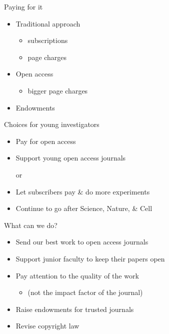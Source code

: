 \documentclass[12pt,t]{beamer}
\newcommand{\bi}{\begin{itemize}}
\newcommand{\ei}{\end{itemize}}
\begin{document}
\begin{frame}{Paying for it}

\vspace{36pt}

\bi
\itemsep12pt
\item Traditional approach
\bi
\item subscriptions
\item page charges
\ei
\item Open access
\bi
\item bigger page charges
\ei
\item Endowments
\ei
\end{frame}

\begin{frame}{Choices for young investigators}

\vspace{36pt}

\bi
\item Pay for open access
\item Support young open access journals

\vspace*{12pt}

\hspace{2cm} {\color{vhilight} \sc or}

\vspace*{12pt}

\item Let subscribers pay \& do more experiments
\item Continue to go after Science, Nature, \& Cell
\ei
\end{frame}


\begin{frame}{What can we do?}

\vspace{36pt}

\bi
\itemsep12pt
\item Send our best work to open access journals
\item Support junior faculty to keep their papers open
\item Pay attention to the quality of the work
\bi
\item[] (not the impact factor of the journal)
\ei
\item Raise endowments for trusted journals
\item {\color<2>{vhilight} Revise copyright law}
\ei
\end{frame}
\end{document}
